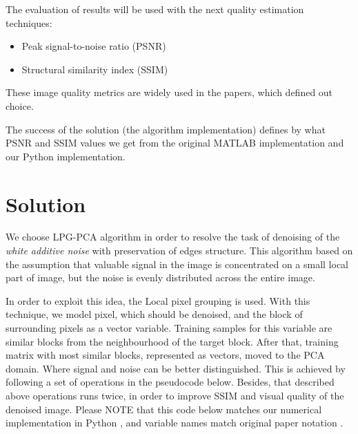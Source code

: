 The evaluation of results will be used with the next quality estimation techniques: 
\begin{itemize}
    \item Peak signal-to-noise ratio (PSNR) 
    \item Structural similarity index (SSIM) 
\end{itemize}
These image quality metrics are widely used in the papers, which defined out choice. 

The success of the solution (the algorithm implementation) defines by what PSNR and SSIM values we get from the original MATLAB implementation and our Python implementation. 

\section{Solution}

We choose LPG-PCA algorithm in order to resolve the task of denoising of the \emph{white additive noise} with preservation of edges structure. This algorithm based on the assumption that valuable signal in the image is concentrated on a small local part of image, but the noise is evenly distributed across the entire image. 

In order to exploit this idea, the Local pixel grouping is used. With this technique, we model pixel, which should be denoised, and the block of surrounding pixels as a vector variable. Training samples for this variable are similar blocks from the neighbourhood of the target block. After that, training matrix with most similar blocks, represented as vectors, moved to the PCA domain. Where signal and noise can be better distinguished. This is achieved by following a set of operations in the pseudocode below. Besides, that described above operations runs twice, in order to improve SSIM and visual quality of the denoised image.
Please NOTE that this code below matches our numerical implementation in Python \cite{our_github}, and variable names match original paper notation \cite{zhang2010two}.

